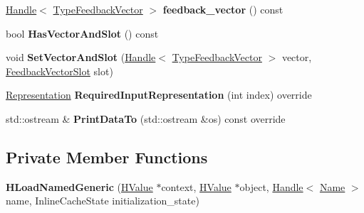 \begin{DoxyCompactItemize}
\item 
\hyperlink{classv8_1_1internal_1_1_handle}{Handle}$<$ \hyperlink{classv8_1_1internal_1_1_type_feedback_vector}{Type\+Feedback\+Vector} $>$ {\bfseries feedback\+\_\+vector} () const \hypertarget{classv8_1_1internal_1_1_h_load_named_generic_ab7eba3f44d3614b054f6e56595f593ef}{}\label{classv8_1_1internal_1_1_h_load_named_generic_ab7eba3f44d3614b054f6e56595f593ef}

\item 
bool {\bfseries Has\+Vector\+And\+Slot} () const \hypertarget{classv8_1_1internal_1_1_h_load_named_generic_a878f8d1cf2c54720ec2d442817798ada}{}\label{classv8_1_1internal_1_1_h_load_named_generic_a878f8d1cf2c54720ec2d442817798ada}

\item 
void {\bfseries Set\+Vector\+And\+Slot} (\hyperlink{classv8_1_1internal_1_1_handle}{Handle}$<$ \hyperlink{classv8_1_1internal_1_1_type_feedback_vector}{Type\+Feedback\+Vector} $>$ vector, \hyperlink{classv8_1_1internal_1_1_feedback_vector_slot}{Feedback\+Vector\+Slot} slot)\hypertarget{classv8_1_1internal_1_1_h_load_named_generic_a5c7b08a22e6bd7e14a590cf26a0d34c9}{}\label{classv8_1_1internal_1_1_h_load_named_generic_a5c7b08a22e6bd7e14a590cf26a0d34c9}

\item 
\hyperlink{classv8_1_1internal_1_1_representation}{Representation} {\bfseries Required\+Input\+Representation} (int index) override\hypertarget{classv8_1_1internal_1_1_h_load_named_generic_a014769fd4150565cd98e2fa59cb6bf67}{}\label{classv8_1_1internal_1_1_h_load_named_generic_a014769fd4150565cd98e2fa59cb6bf67}

\item 
std\+::ostream \& {\bfseries Print\+Data\+To} (std\+::ostream \&os) const  override\hypertarget{classv8_1_1internal_1_1_h_load_named_generic_a909229c8fc8eb4a27ad5a893c5e15acb}{}\label{classv8_1_1internal_1_1_h_load_named_generic_a909229c8fc8eb4a27ad5a893c5e15acb}

\end{DoxyCompactItemize}
\subsection*{Private Member Functions}
\begin{DoxyCompactItemize}
\item 
{\bfseries H\+Load\+Named\+Generic} (\hyperlink{classv8_1_1internal_1_1_h_value}{H\+Value} $\ast$context, \hyperlink{classv8_1_1internal_1_1_h_value}{H\+Value} $\ast$object, \hyperlink{classv8_1_1internal_1_1_handle}{Handle}$<$ \hyperlink{classv8_1_1internal_1_1_name}{Name} $>$ name, Inline\+Cache\+State initialization\+\_\+state)\hypertarget{classv8_1_1internal_1_1_h_load_named_generic_afd34044fe9bc0ffe9ebd6827c8d1b7f7}{}\label{classv8_1_1internal_1_1_h_load_named_generic_afd34044fe9bc0ffe9ebd6827c8d1b7f7}

\end{DoxyCompactItemize}
